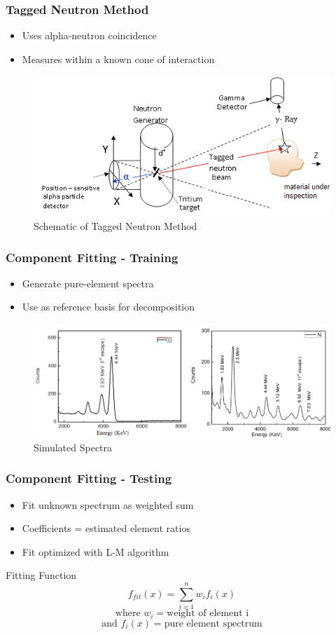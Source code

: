 \documentclass[xcolor=dvipsnames,envcountsect]{beamer}
\begin{document}
\begin{frame}
  \frametitle{Tagged Neutron Method}
  \begin{itemize}
    \item Uses alpha-neutron coincidence
    \item Measures within a known cone of interaction
  \end{itemize}
  \begin{figure}
      \centering
      \includegraphics[width=.5\linewidth]{Figures/Schematicrepresentationofassociatedparticlebasedtaggedneutronmethod.png}
      \caption{Schematic of Tagged Neutron Method}
      \label{fig:taggedneutronmethod}
  \end{figure}
\end{frame}

\begin{frame}
  \frametitle{Component Fitting - Training}
  \begin{itemize}
    \item Generate pure-element spectra
    \item Use as reference basis for decomposition
  \end{itemize}
  \begin{figure}
      \centering
      \includegraphics[width=.5\linewidth]{Figures/simulatedspectra.png}
      \caption{Simulated Spectra}
      \label{fig:simulatedspectra}
  \end{figure}

\end{frame}

\begin{frame}
  \frametitle{Component Fitting - Testing}
  \begin{itemize}
    \item Fit unknown spectrum as weighted sum
    \item Coefficients = estimated element ratios
    \item Fit optimized with L-M algorithm
  \end{itemize}
  \begin{block}{Fitting Function}
    \begin{equation}
      f_{fit}(x) = \sum_{i=1}^{n} w_i f_i(x)
    \end{equation}
    $$
      \text{where } w_i = \text{weight of element i}
    $$
    $$
      \text{and } f_i(x) = \text{pure element spectrum}
    $$
  \end{block}
\end{frame}
\end{document}
